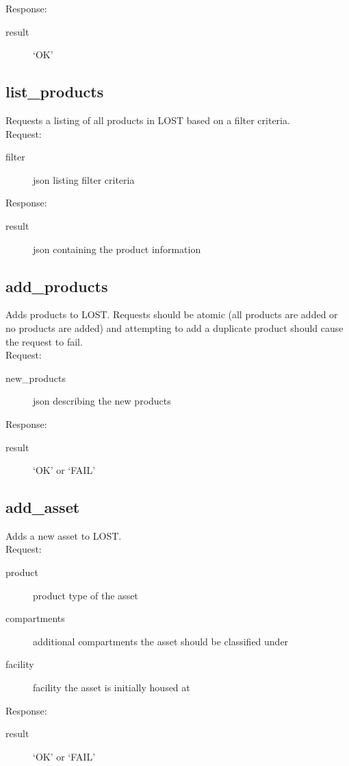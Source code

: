 \noindent Response:
\begin{description}
\item[result] `OK'
\end{description}


\subsection*{list\_products}
Requests a listing of all products in LOST based on a filter criteria.
\\

\noindent Request:
\begin{description}
\item[filter] json listing filter criteria
\end{description}

\noindent Response:
\begin{description}
\item[result] json containing the product information
\end{description}


\subsection*{add\_products}
Adds products to LOST. Requests should be atomic (all products are added or no products are added) and attempting to add a duplicate product should cause the request to fail.
\\

\noindent Request:
\begin{description}
\item[new\_products] json describing the new products
\end{description}

\noindent Response:
\begin{description}
\item[result] `OK' or `FAIL'
\end{description}


\subsection*{add\_asset}
Adds a new asset to LOST.
\\

\noindent Request:
\begin{description}
\item[product] product type of the asset
\item[compartments] additional compartments the asset should be classified under
\item[facility] facility the asset is initially housed at
\end{description}

\noindent Response:
\begin{description}
\item[result] `OK' or `FAIL'
\end{description}